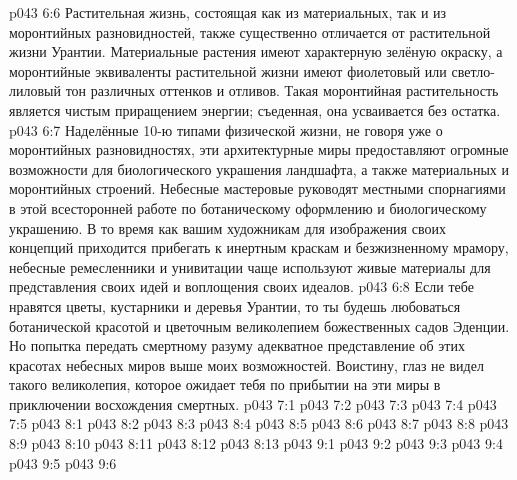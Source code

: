 \vs p043 6:6 Растительная жизнь, состоящая как из материальных, так и из моронтийных разновидностей, также существенно отличается от растительной жизни Урантии. Материальные растения имеют характерную зелёную окраску, а моронтийные эквиваленты растительной жизни имеют фиолетовый или светло\hyp{}лиловый тон различных оттенков и отливов. Такая моронтийная растительность является чистым приращением энергии; съеденная, она усваивается без остатка.
\vs p043 6:7 Наделённые 10-ю типами физической жизни, не говоря уже о моронтийных разновидностях, эти архитектурные миры предоставляют огромные возможности для биологического украшения ландшафта, а также материальных и моронтийных строений. Небесные мастеровые руководят местными спорнагиями в этой всесторонней работе по ботаническому оформлению и биологическому украшению. В то время как вашим художникам для изображения своих концепций приходится прибегать к инертным краскам и безжизненному мрамору, небесные ремесленники и унивитации чаще используют живые материалы для представления своих идей и воплощения своих идеалов.
\vs p043 6:8 Если тебе нравятся цветы, кустарники и деревья Урантии, то ты будешь любоваться ботанической красотой и цветочным великолепием божественных садов Эденции. Но попытка передать смертному разуму адекватное представление об этих красотах небесных миров выше моих возможностей. Воистину, глаз не видел такого великолепия, которое ожидает тебя по прибытии на эти миры в приключении восхождения смертных.
\vs p043 7:1 
\vs p043 7:2 
\vs p043 7:3 
\vs p043 7:4 
\vs p043 7:5 
\vs p043 8:1 
\vs p043 8:2 
\vs p043 8:3 
\vs p043 8:4 
\vs p043 8:5 
\vs p043 8:6 
\vs p043 8:7 
\vs p043 8:8 
\vs p043 8:9 
\vs p043 8:10 
\vs p043 8:11 
\vs p043 8:12 \pc 
\vs p043 8:13 
\vs p043 9:1 
\vs p043 9:2 \pc 
\vs p043 9:3 
\vs p043 9:4 \pc 
\vs p043 9:5 
\vsetoff
\vs p043 9:6 
\quizlink
